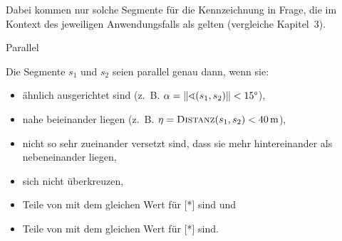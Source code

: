 \documentclass[../main/thesis.tex]{subfiles}
\begin{document}

Dabei kommen nur solche Segmente für die Kennzeichnung in Frage, die im Kontext des jeweiligen Anwendungsfalls als  gelten (vergleiche Kapitel~3).

\begin{algorithmhere}{Parallel}
\label{alg:Parallel}
\begin{algorithmic}
	\State Die Segmente $s_1$ und $s_2$ seien parallel genau dann, wenn sie:
	\begin{itemize}[nosep,leftmargin=3.5em]
		\item ähnlich ausgerichtet sind (z.~B. $\alpha = |\!\;\!|\sphericalangle (s_1, s_2)|\!\;\!| < 15\degree$),
		\item nahe beieinander liegen (z.~B. $\eta = \textproc{Distanz}(s_1, s_2) < \unit[40]{m}$),
		\item nicht so sehr zueinander versetzt sind, dass sie mehr hintereinander als nebeneinander liegen,  %
		\item sich nicht überkreuzen,  %
		\item Teile von  mit dem gleichen Wert für [*] sind und
		\item Teile von  mit dem gleichen Wert für [*] sind.
	\end{itemize}
\EndFunction
\end{algorithmic}
\end{algorithmhere}

\end{document}

